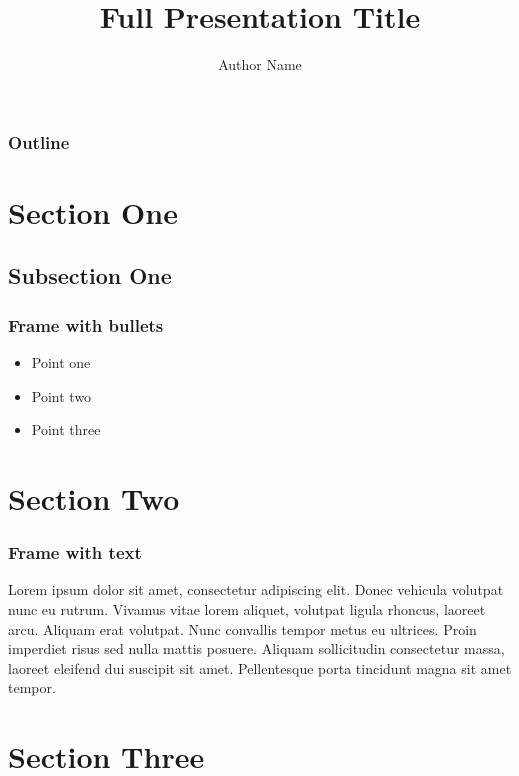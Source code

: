 \documentclass{beamer}
\title[Short Title]{Full Presentation Title}
\author{Author Name}
\institute[Institution Short Name]{Full Institution Name}
\date{}
\begin{document}
\begin{frame}
    \titlepage{}
\end{frame}

\begin{frame}
    \frametitle{Outline}
    \tableofcontents
\end{frame}

\section{Section One}
\sectionframe{}

\subsection{Subsection One}
\begin{frame}
    \frametitle{Frame with bullets}
    \begin{itemize}[<+-|alert@+>]
        \item Point one
        \item Point two
        \item Point three
    \end{itemize}
\end{frame}

\section{Section Two}
\sectionframe{}

\begin{frame}
    \frametitle{Frame with text}
    Lorem ipsum dolor sit amet, consectetur adipiscing elit. Donec vehicula volutpat nunc eu rutrum. Vivamus vitae lorem aliquet, volutpat ligula rhoncus, laoreet arcu. Aliquam erat volutpat. Nunc convallis tempor metus eu ultrices. Proin imperdiet risus sed nulla mattis posuere. Aliquam sollicitudin consectetur massa, laoreet eleifend dui suscipit sit amet. Pellentesque porta tincidunt magna sit amet tempor.
\end{frame}

\section{Section Three}
\sectionframe{}
\end{document}
